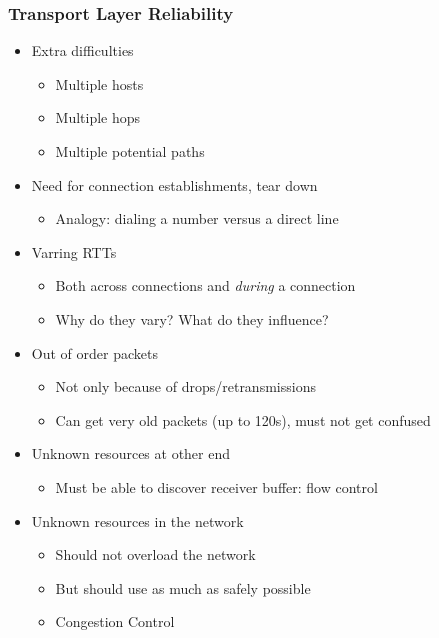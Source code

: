 \subsubsection{Transport Layer Reliability}
\begin{itemize}[nosep]
    \item Extra difficulties
          \begin{itemize}[nosep]
              \item Multiple hosts
              \item Multiple hops
              \item Multiple potential paths
          \end{itemize}
    \item Need for connection establishments, tear down
          \begin{itemize}[nosep]
              \item Analogy: dialing a number versus a direct line
          \end{itemize}
    \item Varring RTTs
          \begin{itemize}[nosep]
              \item Both across connections and \emph{during} a connection
              \item Why do they vary? What do they influence?
          \end{itemize}
    \item Out of order packets
          \begin{itemize}
              \item Not only because of drops/retransmissions
              \item Can get very old packets (up to 120s), must not get confused
          \end{itemize}
    \item Unknown resources at other end
          \begin{itemize}[nosep]
              \item Must be able to discover receiver buffer: flow control
          \end{itemize}
    \item Unknown resources in the network
          \begin{itemize}[nosep]
              \item Should not overload the network
              \item But should use as much as safely possible
              \item Congestion Control
          \end{itemize}
\end{itemize}
